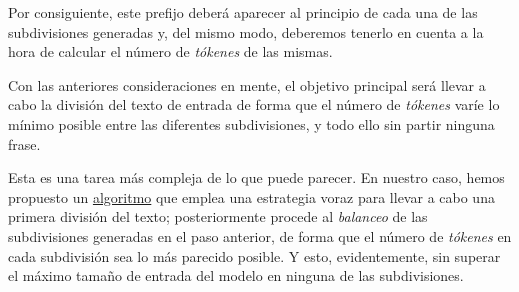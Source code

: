 Por consiguiente, este prefijo deberá aparecer al principio de cada una de las subdivisiones generadas y, del mismo modo, deberemos tenerlo en cuenta a la hora de calcular el número de \emph{tókenes} de las mismas.

Con las anteriores consideraciones en mente, el objetivo principal será llevar a cabo la división del texto de entrada de forma que el número de \emph{tókenes} varíe lo mínimo posible entre las diferentes subdivisiones, y todo ello sin partir ninguna frase.

Esta es una tarea más compleja de lo que puede parecer. En nuestro caso, hemos propuesto un \hyperref[alg:division-codificacion]{algoritmo} que emplea una estrategia voraz para llevar a cabo una primera división del texto; posteriormente procede al \emph{balanceo} de las subdivisiones generadas en el paso anterior, de forma que el número de \emph{tókenes} en cada subdivisión sea lo más parecido posible. Y esto, evidentemente, sin superar el máximo tamaño de entrada del modelo en ninguna de las subdivisiones.

\newpage

